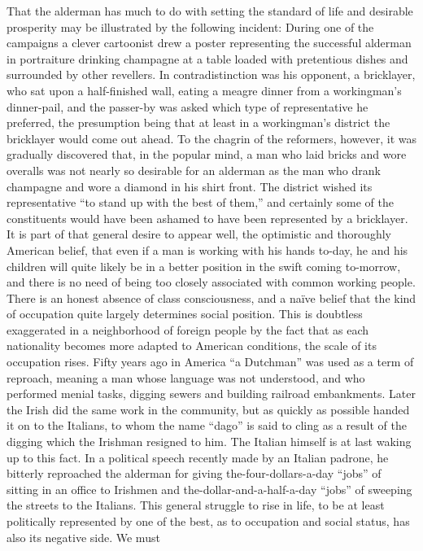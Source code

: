 \documentclass[]{article}
\begin{document}
\begin{sectionbody}
\addamsparagraph That the alderman has much to do with setting the standard of life and
desirable prosperity may be illustrated by the following incident:
During one of the campaigns a clever cartoonist drew a poster
representing the successful alderman in portraiture drinking champagne
at a table loaded with pretentious dishes and surrounded by other
revellers. In contradistinction was his opponent, a bricklayer, who sat
upon a half-finished wall, eating a meagre dinner from a workingman's
dinner-pail, and the passer-by was asked which type of representative he
preferred, the presumption being that at least in a workingman's
district the bricklayer would come out ahead. To the chagrin of the
reformers, however, it was gradually discovered that, in the popular
mind, a man who laid bricks and wore overalls was not nearly so
desirable for an alderman as the man who drank champagne and wore a
diamond in his shirt front. The district wished its representative ``to
stand up with the best of them,'' and certainly some of the constituents
would have been ashamed to have been represented by a bricklayer. It is
part of that general desire to appear well, the optimistic and
thoroughly American belief, that even if a man is working with his hands
to-day, he and his children will quite likely be in a better position in
the swift coming to-morrow, and there is no need of being too closely
associated with common working people. There is an honest absence of
class consciousness, and a naïve belief that the kind of occupation
quite largely determines social position. This is doubtless exaggerated
in a neighborhood of foreign people by the fact that as each nationality
becomes more adapted to American conditions, the scale of its occupation
rises. Fifty years ago in America ``a Dutchman'' was used as a term of
reproach, meaning a man whose language was not understood, and who
performed menial tasks, digging sewers and building railroad
embankments. Later the Irish did the same work in the community, but as
quickly as possible handed it on to the Italians, to whom the name
``dago'' is said to cling as a result of the digging which the Irishman
resigned to him. The Italian himself is at last waking up to this fact.
In a political speech recently made by an Italian padrone, he bitterly
reproached the alderman for giving the-four-dollars-a-day ``jobs'' of
sitting in an office to Irishmen and the-dollar-and-a-half-a-day ``jobs''
of sweeping the streets to the Italians. This general struggle to rise
in life, to be at least politically represented by one of the best, as
to occupation and social status, has also its negative side. We must

\end{sectionbody}
\end{document}
